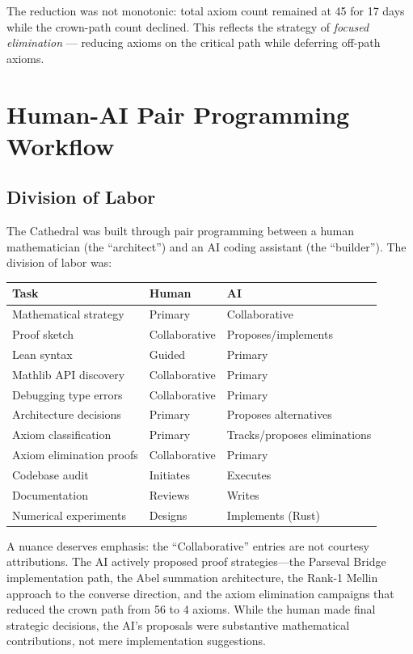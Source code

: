 \documentclass[11pt,a4paper]{article}
\begin{document}
The reduction was not monotonic: total axiom count remained at 45
for 17 days while the crown-path count declined. This reflects the
strategy of \emph{focused elimination} --- reducing axioms on the
critical path while deferring off-path axioms.

\section{Human-AI Pair Programming Workflow}
\label{sec:workflow}

\subsection{Division of Labor}

The Cathedral was built through pair programming between a human
mathematician (the ``architect'') and an AI coding assistant (the
``builder''). The division of labor was:

\begin{center}
\begin{tabular}{@{}lll@{}}
\toprule
\textbf{Task} & \textbf{Human} & \textbf{AI} \\
\midrule
Mathematical strategy & Primary & Collaborative \\
Proof sketch & Collaborative & Proposes/implements \\
Lean syntax & Guided & Primary \\
Mathlib API discovery & Collaborative & Primary \\
Debugging type errors & Collaborative & Primary \\
Architecture decisions & Primary & Proposes alternatives \\
Axiom classification & Primary & Tracks/proposes eliminations \\
Axiom elimination proofs & Collaborative & Primary \\
Codebase audit & Initiates & Executes \\
Documentation & Reviews & Writes \\
Numerical experiments & Designs & Implements (Rust) \\
\bottomrule
\end{tabular}
\end{center}

A nuance deserves emphasis: the ``Collaborative'' entries are not
courtesy attributions. The AI actively proposed proof strategies---the
Parseval Bridge implementation path, the Abel summation architecture,
the Rank-1 Mellin approach to the converse direction, and the axiom
elimination campaigns that reduced the crown path from 56 to 4 axioms.
While the human made final strategic decisions, the AI's proposals
were substantive mathematical contributions, not mere implementation
suggestions.
\end{document}
